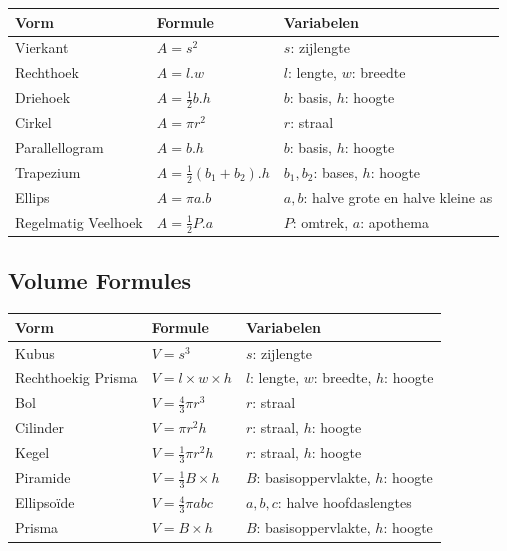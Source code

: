 \documentclass[a5paper]{article}
\begin{document}
\begin{table}[h!]
\begin{tabular}{|l|l|l|}
\hline
\textbf{Vorm} & \textbf{Formule} & \textbf{Variabelen} \\
\hline
Vierkant & $A = s^2$ & $s$: zijlengte \\
\hline
Rechthoek & $A = l.w$ & $l$: lengte, $w$: breedte \\
\hline
Driehoek & $A = \frac{1}{2} b.h$ & $b$: basis, $h$: hoogte \\
\hline
Cirkel & $A = \pi r^2$ & $r$: straal \\
\hline
Parallellogram & $A = b.h$ & $b$: basis, $h$: hoogte \\
\hline
Trapezium & $A = \frac{1}{2} (b_1 + b_2).h$ & $b_1, b_2$: bases, $h$: hoogte \\
\hline
Ellips & $A = \pi a.b$ & $a, b$: halve grote en halve kleine as \\
\hline
Regelmatig Veelhoek & $A = \frac{1}{2} P.a$ & $P$: omtrek, $a$: apothema \\
\hline
\end{tabular}
\end{table}

\subsection{Volume Formules}

\begin{table}[h!]
\begin{tabular}{|l|l|l|}
\hline
\textbf{Vorm} & \textbf{Formule} & \textbf{Variabelen} \\
\hline
Kubus & $V = s^3$ & $s$: zijlengte \\
\hline
Rechthoekig Prisma & $V = l \times w \times h$ & $l$: lengte, $w$: breedte, $h$: hoogte \\
\hline
Bol & $V = \frac{4}{3} \pi r^3$ & $r$: straal \\
\hline
Cilinder & $V = \pi r^2 h$ & $r$: straal, $h$: hoogte \\
\hline
Kegel & $V = \frac{1}{3} \pi r^2 h$ & $r$: straal, $h$: hoogte \\
\hline
Piramide & $V = \frac{1}{3} B \times h$ & $B$: basisoppervlakte, $h$: hoogte \\
\hline
Ellipsoïde & $V = \frac{4}{3} \pi a b c$ & $a, b, c$: halve hoofdaslengtes \\
\hline
Prisma & $V = B \times h$ & $B$: basisoppervlakte, $h$: hoogte \\
\hline
\end{tabular}
\end{table}
\end{document}
